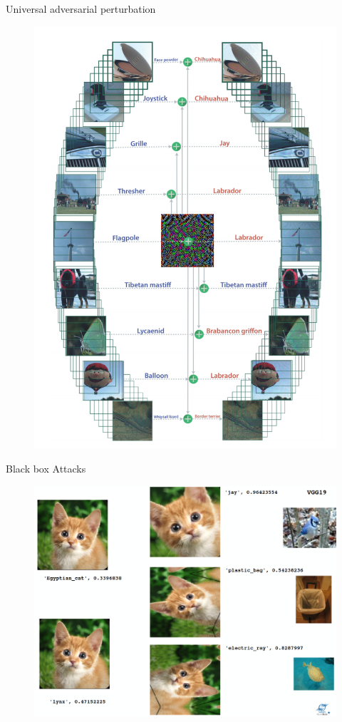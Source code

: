 \documentclass[xcolor=pdftex,dvipsnames,table,mathserif]{beamer}
\begin{document}

\begin{frame}{Universal adversarial perturbation \cite{moosavi2017universal}}
\begin{figure}
\includegraphics[width=.45\columnwidth]{../graphics/UniversalPerturbation}
\end{figure}
\end{frame}

\begin{frame}{Black box Attacks \cite{akhtar2018threat}}

\begin{figure}
\includegraphics[width=.95\columnwidth]{../graphics/WhiteBoxAttack}
\end{figure}
\end{frame}
\end{document}
